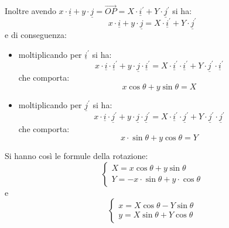 \documentclass[a4paper,12pt, oneside]{book}
\begin{document}
Inoltre avendo $x\cdot \underline{i}+y\cdot \underline{j}=\vec{OP}=X\cdot \underline{i}^{'}+Y\cdot \underline{j}^{'}$ si ha:
$$x\cdot \underline{i}+y\cdot \underline{j}=X\cdot \underline{i}^{'}+Y\cdot \underline{j}^{'}$$
e di conseguenza:
\begin{itemize}
	\item moltiplicando per $\underline{i}^{'}$ si ha:
	      $$x\cdot \underline{i}\cdot \underline{i}^{'}+y\cdot \underline{j}\cdot \underline{i}^{'}=X\cdot \underline{i}^{'}\cdot \underline{i}^{'}+Y\cdot \underline{j}^{'}\cdot \underline{i}^{'}$$
	      che comporta:
	      $$x\cos \theta+y\sin\theta=X$$
	\item moltiplicando per $\underline{j}^{'}$ si ha:
	      $$x\cdot \underline{i}\cdot \underline{j}^{'}+y\cdot \underline{j}\cdot \underline{j}^{'}=X\cdot \underline{i}^{'}\cdot \underline{j}^{'}+Y\cdot \underline{j}^{'}\cdot \underline{j}^{'}$$
	      che comporta:
	      $$x\cdot \sin\theta+y\cos\theta=Y$$
\end{itemize}
Si hanno così le formule della rotazione:
$$\begin{cases}
		X=x\cos \theta +y\sin\theta \\
		Y=-x\cdot\sin\theta+y\cdot \cos\theta
	\end{cases}$$
e
$$\begin{cases}
		x=X\cos\theta-Y\sin\theta \\
		y=X\sin\theta+Y\cos\theta
	\end{cases}
$$
\end{document}
